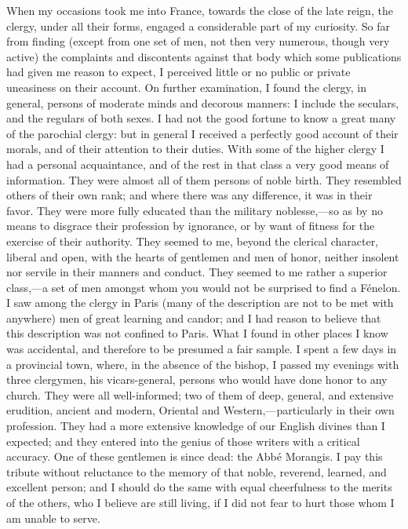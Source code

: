 When my occasions took me into France, towards the close of the late reign, the clergy, under all their forms, engaged a considerable part of my curiosity. So far from finding (except from one set of men, not then very numerous, though very active) the complaints and discontents against that body which some publications had given me reason to expect, I perceived little or no public or private uneasiness on their account. On further examination, I found the clergy, in general, persons of moderate minds and decorous manners: I include the seculars, and the regulars of both sexes. I had not the good fortune to know a great many of the parochial clergy: but in general I received a perfectly good account of their morals, and of their attention to their duties. With some of the higher clergy I had a personal acquaintance, and of the rest in that class a very good means of information. They were almost all of them persons of noble birth. They resembled others of their own rank; and where there was any difference, it was in their favor. They were more fully educated than the military noblesse,—so as by no means to disgrace their profession by ignorance, or by want of fitness for the exercise of their authority. They seemed to me, beyond the clerical character, liberal and open, with the hearts of gentlemen and men of honor, neither insolent nor servile in their manners and conduct. They seemed to me rather a superior class,—a set of men amongst whom you would not be surprised to find a Fénelon. I saw among the clergy in Paris (many of the description are not to be met with anywhere) men of great learning and candor; and I had reason to believe that this description was not confined to Paris. What I found in other places I know was accidental, and therefore to be presumed a fair sample. I spent a few days in a provincial town, where, in the absence of the bishop, I passed my evenings with three clergymen, his vicars-general, persons who would have done honor to any church. They were all well-informed; two of them of deep, general, and extensive erudition, ancient and modern, Oriental and Western,—particularly in their own profession. They had a more extensive knowledge of our English divines than I expected; and they entered into the genius of those writers with a critical accuracy. One of these gentlemen is since dead: the Abbé Morangis. I pay this tribute without reluctance to the memory of that noble, reverend, learned, and excellent person; and I should do the same with equal cheerfulness to the merits of the others, who I believe are still living, if I did not fear to hurt those whom I am unable to serve.

